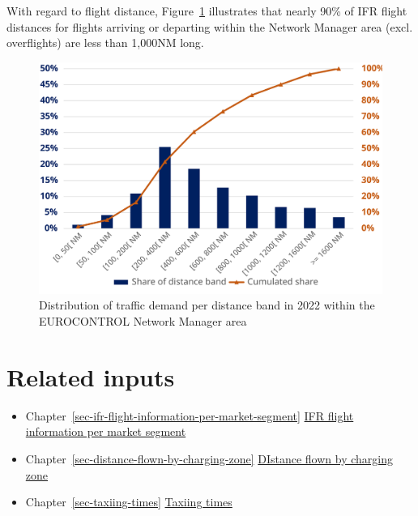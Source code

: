 \documentclass[
  11pt,
  a4paper,
]{book}
\providecommand{\tightlist}{%
  \setlength{\itemsep}{0pt}\setlength{\parskip}{0pt}}\usepackage{longtable,booktabs,array}
\begin{document}
With regard to flight distance,
Figure~\ref{fig-traffic-demand-distribution} illustrates that nearly
90\% of IFR flight distances for flights arriving or departing within
the Network Manager area (excl. overflights) are less than 1,000NM long.

\begin{figure}

{\centering \includegraphics{./figures/traffic_demand_distribution.svg}

}

\caption{\label{fig-traffic-demand-distribution}Distribution of traffic
demand per distance band in 2022 within the EUROCONTROL Network Manager
area}

\end{figure}

\hypertarget{related-inputs-10}{%
\section{Related inputs}\label{related-inputs-10}}

\begin{itemize}
\tightlist
\item
  Chapter~\ref{sec-ifr-flight-information-per-market-segment}
  \protect\hyperlink{sec-ifr-flight-information-per-market-segment}{IFR
  flight information per market segment}
\item
  Chapter~\ref{sec-distance-flown-by-charging-zone}
  \protect\hyperlink{sec-distance-flown-by-charging-zone}{DIstance flown
  by charging zone}
\item
  Chapter~\ref{sec-taxiing-times}
  \protect\hyperlink{sec-taxiing-times}{Taxiing times}
\end{itemize}
\end{document}
